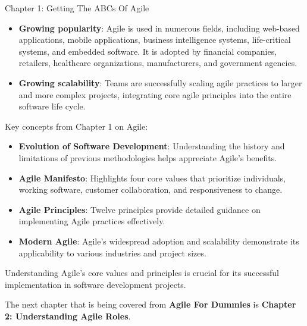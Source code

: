 \begin{notes}{Chapter 1: Getting The ABCs Of Agile}
\begin{highlight}
        \begin{itemize}
            \item \textbf{Growing popularity}: Agile is used in numerous fields, including web-based applications, mobile applications, business intelligence systems, life-critical systems, and 
            embedded software. It is adopted by financial companies, retailers, healthcare organizations, manufacturers, and government agencies.
            \item \textbf{Growing scalability}: Teams are successfully scaling agile practices to larger and more complex projects, integrating core agile principles into the entire software life cycle.
        \end{itemize}
    
    \end{highlight}
    
    \begin{highlight}
    
        Key concepts from Chapter 1 on Agile:
        
        \begin{itemize}
            \item \textbf{Evolution of Software Development}: Understanding the history and limitations of previous methodologies helps appreciate Agile's benefits.
            \item \textbf{Agile Manifesto}: Highlights four core values that prioritize individuals, working software, customer collaboration, and responsiveness to change.
            \item \textbf{Agile Principles}: Twelve principles provide detailed guidance on implementing Agile practices effectively.
            \item \textbf{Modern Agile}: Agile's widespread adoption and scalability demonstrate its applicability to various industries and project sizes.
        \end{itemize}
        
        Understanding Agile's core values and principles is crucial for its successful implementation in software development projects.
    
    \end{highlight}
\end{notes}

The next chapter that is being covered from \textbf{Agile For Dummies} is \textbf{Chapter 2: Understanding Agile Roles}.

